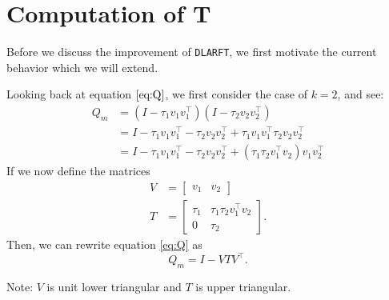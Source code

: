 \documentclass[12pt]{article}
\begin{document}
    \section{Computation of T}
    Before we discuss the improvement of \verb|DLARFT|, we first motivate the current behavior which we will
    extend.
    
    Looking back at equation $\ref{eq:Q}$, we first consider the case of $k=2$, and see:
    \begin{align*}
        Q_m &= \left(I - \tau_1v_1v_1^\top\right)\left(I - \tau_2v_2v_2^\top\right) \\
            &= I - \tau_1v_1v_1^\top - \tau_2v_2v_2^\top + \tau_1v_1v_1^\top\tau_2v_2v_2^\top \\
            &= I - \tau_1v_1v_1^\top - \tau_2v_2v_2^\top + \left(\tau_1\tau_2v_1^\top v_2\right)v_1v_2^\top
    \end{align*}
    If we now define the matrices
    \begin{align*}
        V &= \begin{bmatrix} v_1 & v_2 \end{bmatrix} \\
            T &= \begin{bmatrix} \tau_1 & \tau_1\tau_2v_1^\top v_2 \\
            0 & \tau_2\end{bmatrix}.
    \end{align*}
    Then, we can rewrite equation \ref{eq:Q} as 
    \begin{equation}\label{eq:blockedQ}
        Q_m = I - VTV^\top.
    \end{equation}

    Note: $V$ is unit lower triangular and $T$ is upper triangular.
\end{document}
